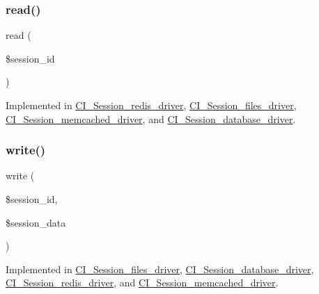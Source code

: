 \mbox{\label{interface_session_handler_interface_a5bbf84ebf657be4eaccc0582377c76bf}} 
\subsubsection{\texorpdfstring{read()}{read()}}
{\footnotesize\ttfamily read (\begin{DoxyParamCaption}\item[{}]{\$session\+\_\+id }\end{DoxyParamCaption})}



Implemented in \mbox{\hyperlink{class_c_i___session__redis__driver_a5bbf84ebf657be4eaccc0582377c76bf}{C\+I\+\_\+\+Session\+\_\+redis\+\_\+driver}}, \mbox{\hyperlink{class_c_i___session__files__driver_a5bbf84ebf657be4eaccc0582377c76bf}{C\+I\+\_\+\+Session\+\_\+files\+\_\+driver}}, \mbox{\hyperlink{class_c_i___session__memcached__driver_a5bbf84ebf657be4eaccc0582377c76bf}{C\+I\+\_\+\+Session\+\_\+memcached\+\_\+driver}}, and \mbox{\hyperlink{class_c_i___session__database__driver_a5bbf84ebf657be4eaccc0582377c76bf}{C\+I\+\_\+\+Session\+\_\+database\+\_\+driver}}.

\mbox{\label{interface_session_handler_interface_ad9d124885be93668f1dbf6aace5964f5}} 
\subsubsection{\texorpdfstring{write()}{write()}}
{\footnotesize\ttfamily write (\begin{DoxyParamCaption}\item[{}]{\$session\+\_\+id,  }\item[{}]{\$session\+\_\+data }\end{DoxyParamCaption})}



Implemented in \mbox{\hyperlink{class_c_i___session__files__driver_ad9d124885be93668f1dbf6aace5964f5}{C\+I\+\_\+\+Session\+\_\+files\+\_\+driver}}, \mbox{\hyperlink{class_c_i___session__database__driver_ad9d124885be93668f1dbf6aace5964f5}{C\+I\+\_\+\+Session\+\_\+database\+\_\+driver}}, \mbox{\hyperlink{class_c_i___session__redis__driver_ad9d124885be93668f1dbf6aace5964f5}{C\+I\+\_\+\+Session\+\_\+redis\+\_\+driver}}, and \mbox{\hyperlink{class_c_i___session__memcached__driver_ad9d124885be93668f1dbf6aace5964f5}{C\+I\+\_\+\+Session\+\_\+memcached\+\_\+driver}}.



